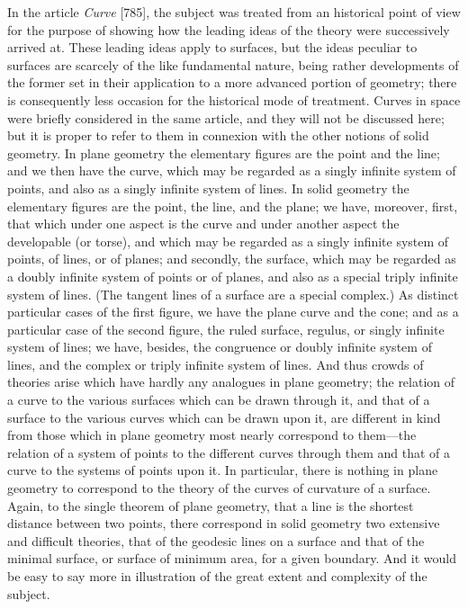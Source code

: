\documentclass[11pt,a4paper]{book}
\begin{document}
In the article \textit{Curve} [785], the subject was treated from an historical point of view for the purpose of showing how the leading ideas of the theory were successively arrived at. These leading ideas apply to surfaces, but the ideas peculiar to surfaces are scarcely of the like fundamental nature, being rather developments of the former set in their application to a more advanced portion of geometry; there is consequently less occasion for the historical mode of treatment. Curves in space were briefly considered in the same article, and they will not be discussed here; but it is proper to refer to them in connexion with the other notions of solid geometry. In plane geometry the elementary figures are the point and the line; and we then have the curve, which may be regarded as a singly infinite system of points, and also as a singly infinite system of lines. In solid geometry the elementary figures are the point, the line, and the plane; we have, moreover, first, that which under one aspect is the curve and under another aspect the developable (or torse), and which may be regarded as a singly infinite system of points, of lines, or of planes; and secondly, the surface, which may be regarded as a doubly infinite system of points or of planes, and also as a special triply infinite system of lines. (The tangent lines of a surface are a special complex.) As distinct particular cases of the first figure, we have the plane curve and the cone; and as a particular case of the second figure, the ruled surface, regulus, or singly infinite system of lines; we have, besides, the congruence or doubly infinite system of lines, and the complex or triply infinite system of lines. And thus crowds of theories arise which have hardly any analogues in plane geometry; the relation of a curve to the various surfaces which can be drawn through it, and that of a surface to the various curves which can be drawn upon it, are different in kind from those which in plane geometry most nearly correspond to them---the relation of a system of points to the different curves through them and that of a curve to the systems of points upon it. In particular, there is nothing in plane geometry to correspond to the theory of the curves of curvature of a surface. Again, to the single theorem of plane geometry, that a line is the shortest distance between two points, there correspond in solid geometry two extensive and difficult theories, that of the geodesic lines on a surface and that of the minimal surface, or surface of minimum area, for a given boundary. And it would be easy to say more in illustration of the great extent and complexity of the subject.
\end{document}
